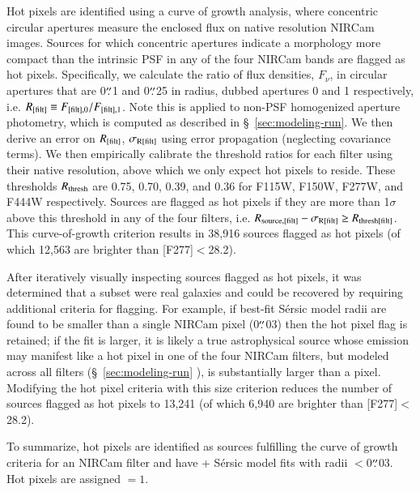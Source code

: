 \documentclass[longauth]{aa}
\begin{document}
Hot pixels are identified using a curve of growth analysis, where concentric circular apertures measure the enclosed flux on native resolution NIRCam images.  Sources for which concentric apertures indicate a morphology more compact than the intrinsic PSF in any of the four NIRCam bands are flagged as hot pixels.  Specifically, we calculate the ratio of flux densities, $F_\nu$, in circular apertures that are 0$\overset{\prime\prime}{.}$1 and 0$\overset{\prime\prime}{.}$25 in radius, dubbed apertures 0 and 1 respectively, i.e. $R_{\rm [filt]}\equiv F_{\rm [filt],0}/F_{\rm [filt],1}$.  Note this is applied to non-PSF homogenized aperture photometry, which is computed as described in \S~\ref{sec:modeling-run}. We then derive an error on $R_{\rm [filt]}$, $\sigma_{\rm R[filt]}$ using error propagation (neglecting covariance terms). We then empirically calibrate the threshold ratios for each filter using their native resolution, above which we only expect hot pixels to reside.  These thresholds $R_{\rm thresh}$ are 0.75, 0.70, 0.39, and 0.36 for F115W, F150W, F277W, and F444W respectively.  Sources are flagged as hot pixels if they are more than 1$\sigma$ above this threshold in any of the four filters, i.e. $R_{\rm source,[filt]} - \sigma_{\rm R[filt]} \ge R_{\rm thresh[filt]}$. This curve-of-growth criterion results in 38,916 sources flagged as hot pixels (of which 12,563 are brighter than [F277]$<$28.2).

After iteratively visually inspecting sources flagged as hot pixels, it was determined that a subset were real galaxies and could be recovered by requiring additional criteria for flagging.  For example, if best-fit Sérsic model radii are found to be smaller than a single NIRCam pixel (0$\overset{\prime\prime}{.}$03) then the hot pixel flag is retained; if the fit is larger, it is likely a true astrophysical source whose emission may manifest like a hot pixel in one of the four NIRCam filters, but modeled across all filters (\S~\ref{sec:modeling-run} ), is substantially larger than a pixel.  Modifying the hot pixel criteria with this size criterion reduces the number of sources flagged as hot pixels to 13,241 (of which 6,940 are brighter than [F277]$<$28.2).

To summarize, hot pixels are identified as sources fulfilling the curve of growth criteria for an  NIRCam filter and have \SEpp+ S\'ersic model fits with radii $<$0$\overset{\prime\prime}{.}$03. Hot pixels are assigned \warnfl$=1$.
\end{document}
